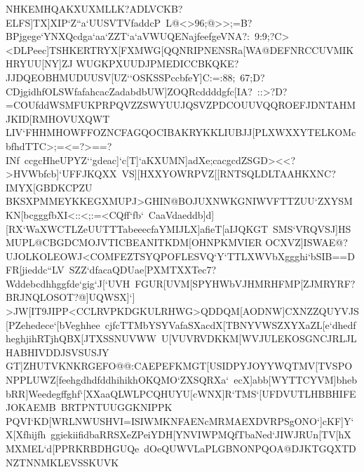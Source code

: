 {{{ }
 \hbox{NHKEMHQAKXUXMLLK?ADLVCKB?ELFS]TX]XIP`Z``a`UUSVTVfaddcP%
 L@<>96;@>>;=B?BPjgege`YNXQcdga`aa`ZZT`a`aVWUQENajfeefgeVNA?:%
 9:9;?C><DLPeec]TSHKERTRYX[FXMWG[QQNRIPNENSRa[WA@DEFNRCCUVMIKHRYUU[NY]ZJ}
 \hbox{WUGKPXUUDJPMEDICCBKQKE?JJDQEOBHMUDUUSV[UZ``OSKSSPccbfeY]C:=:88;%
 67;D?CDjgidhfOLSWfafahcacZadabdbUW]ZOQRcddddgfc[IA?%
 ::>?D?=COUfddWSMFUKPRPQVZZSWYUUJQSVZPDCOUUVQQROEFJDNTAHMJKID[RMHOVUXQWT}
 \hbox{LIV`FHHMHOWFFOZNCFAGQOCIBAKRYKKLIUBJJ[PLXWXXYTELKOMcbfhdTTC>;=<=?>==?INf%
 ccgcHheUPYZ``gdeac]`c[T]`aKXUMN]adXe;cacgcdZSGD><<?>HVWbfcb]`UFFJKQXX%
 VS][HXXYOWRPVZ[[RNTSQLDLTAAHKXNC?IMYX[GBDKCPZU}
 \hbox{BKSXPMMEYKKEGXMUPJ>GHIN@BOJUXNWKGNIWVFTTZUU`ZXYSMKN[bcgggfbXI<::<;:=<CQff`fb`%
 CaaVdaeddb]d][RX`WaXWCTLZeUUTTTabeeecfaYMIJLX]afieT[aIJQKGT%
 SMS`VRQVSJ]HSMUPL@CBGDCMOJVTICBEANITKDM[OHNPKMVIER}
 \hbox{OCXVZ]ISWAE@?UJOLKOLEOWJ<COMFEZTSYQPOFLESVQ`Y`TTLXWVbXggghi`bSIB==DFR[jieddc``LV%
 SZZ`dfacaQDUae[PXMTXXTec7?Wddebcdhhggfde`gig`J[`UVH%
 FGUR[UVM[SPYHWbVJHMRHFMP[ZJMRYRF?BRJNQLOSOT?@]UQWSX]`]}
 \hbox{>JW[IT9JIPP<CCLRVPKDGKULRHWG>QDDQM[AODNW]CXNZZQUYVJS[PZehedece`[bVeghhee%
 cjfcTTMbYSYVafaSXacdX[TBNYVWSZXYXaZL[e`dhedfheghjihRTjhQBX[JTXSSNUVWW%
 U[VUVRVDKKM[WVJULEKOSGNCJRLJLHABHIVDDJSVSUSJY}
 \hbox{GT]ZHUTVKNKRGEFO@@:CAEPEFKMGT[USIDPYJOYYWQTMV[TVSPONPPLUWZ[feehgdhdfddhihikhOKQMO`ZXSQRXa`%
 ecX]abb[WYTTCYVM]bhebbRR]Weedegffghf`[XXaaQLWLPCQHUYU[cWNX]R`TMS`[UFDVUTLHBBHIFEJOKAEMB%
 BRTPNTUUGGKNIPPK}
 \hbox{PQVI`KD[WRLNWUSHVI=ISIWMKNFAENcMRMAEXDVRPSgONO`]cKF]Y`X[Xfhijfh%
 ggiekiifidbaRRSXeZPeiYDH[YNVIWPMQfTbaNed`JIWJRUn[TV[hXMXMEL`d[PPRKRBDHGUQe%
 dOeQUWVLaPLGBNONPQOA@DJKTGQXTDNZTNNMKLEVSSKUVK}
}}
